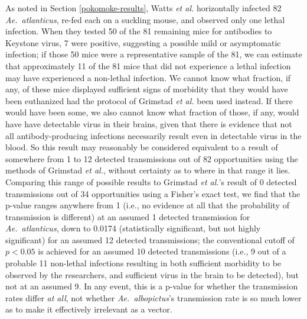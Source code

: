 \documentclass[12pt]{article}
\newcommand{\atl}{\textit{Ae.\ atlanticus}}
\begin{document}
        As noted in Section \ref{pokomoke-results}, Watts \textit{et al.} horizontally infected 82 \atl, re-fed each on a suckling mouse, and observed only one lethal infection. When they tested 50 of the 81 remaining mice for antibodies to Keystone virus, 7 were positive, suggesting a possible mild or asymptomatic infection; if those 50 mice were a representative sample of the 81, we can estimate that approximately 11 of the 81 mice that did not experience a lethal infection may have experienced a non-lethal infection. We cannot know what fraction, if any, of these mice displayed sufficient signs of morbidity that they would have been euthanized had the protocol of Grimstad \textit{et al.} been used instead. If there would have been some, we also cannot know what fraction of those, if any, would have have detectable virus in their brains, given that there is evidence that not all antibody-producing infections necessarily result even in detectable virus in the blood\cite{watts1988maintenance}. So this result may reasonably be considered equivalent to a result of somewhere from 1 to 12 detected transmissions out of 82 opportunities using the methods of Grimstad \textit{et al.}, without certainty as to where in that range it lies. Comparing this range of possible results to Grimstad \textit{et al.}'s result of 0 detected transmissions out of 34 opportunities using a Fisher's exact test, we find that the p-value ranges anywhere from 1 (i.e., no evidence at all that the probability of transmission is different) at an assumed 1 detected transmission for \atl, down to 0.0174 (statistically significant, but not highly significant) for an assumed 12 detected transmissions; the conventional cutoff of $p < 0.05$ is achieved for an assumed 10 detected transmissions (i.e., 9 out of a probable 11 non-lethal infections resulting in both sufficient morbidity to be observed by the researchers, and sufficient virus in the brain to be detected), but not at an assumed 9. In any event, this is a p-value for whether the transmission rates differ \textit{at all}, not whether \textit{Ae.~albopictus}'s transmission rate is so much lower as to make it effectively irrelevant as a vector.
\end{document}
